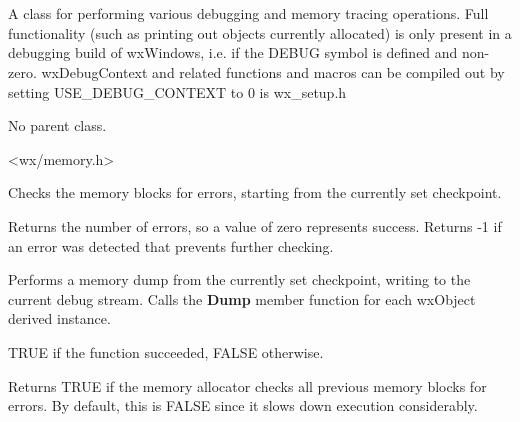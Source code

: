 \section{}\label{wxdebugcontext}

A class for performing various debugging and memory tracing
operations. Full functionality (such as printing out objects
currently allocated) is only present in a debugging build of wxWindows,
i.e. if the DEBUG symbol is defined and non-zero. wxDebugContext
and related functions and macros can be compiled out by setting
USE\_DEBUG\_CONTEXT to 0 is wx\_setup.h


No parent class.


<wx/memory.h>




\label{wxdebugcontextcheck}


Checks the memory blocks for errors, starting from the currently set
checkpoint.


Returns the number of errors,
so a value of zero represents success. Returns -1 if an error
was detected that prevents further checking.

\label{wxdebugcontextdump}


Performs a memory dump from the currently set checkpoint, writing to the
current debug stream. Calls the {\bf Dump} member function for each wxObject
derived instance.


TRUE if the function succeeded, FALSE otherwise.

\label{wxdebugcontextgetcheckprevious}


Returns TRUE if the memory allocator checks all previous memory blocks for errors.
By default, this is FALSE since it slows down execution considerably.


